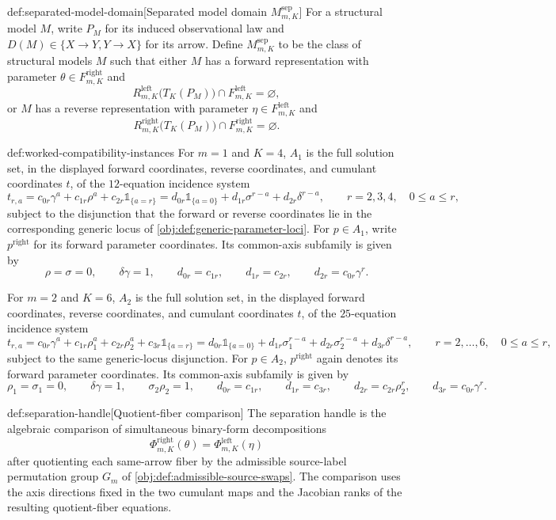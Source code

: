 \begin{definitionv}{def:separated-model-domain}[Separated model domain \(M^{\mathrm{sep}}_{m,K}\)]
For a structural model \(M\), write \(P_M\) for its induced observational law and \(D(M)\in\{X\to Y,Y\to X\}\) for its arrow. Define \(M^{\mathrm{sep}}_{m,K}\) to be the class of structural models \(M\) such that either \(M\) has a forward representation with parameter \(\theta\in F^{\mathrm{right}}_{m,K}\) and
\[
R^{\mathrm{left}}_{m,K}\bigl(T_K(P_M)\bigr)\cap F^{\mathrm{left}}_{m,K}=\varnothing,
\]
or \(M\) has a reverse representation with parameter \(\eta\in F^{\mathrm{left}}_{m,K}\) and
\[
R^{\mathrm{right}}_{m,K}\bigl(T_K(P_M)\bigr)\cap F^{\mathrm{right}}_{m,K}=\varnothing.
\]
\end{definitionv}

\begin{definitionv}{def:worked-compatibility-instances}
For \(m=1\) and \(K=4\), \(A_1\) is the full solution set, in the displayed forward coordinates, reverse coordinates, and cumulant coordinates \(t\), of the \(12\)-equation incidence system
\[
t_{r,a}
=
c_{0r}\gamma^a+c_{1r}\rho^a+c_{2r}\mathbb 1_{\{a=r\}}
=
d_{0r}\mathbb 1_{\{a=0\}}+d_{1r}\sigma^{r-a}+d_{2r}\delta^{r-a},
\qquad
r=2,3,4,\quad 0\leq a\leq r,
\]
subject to the disjunction that the forward or reverse coordinates lie in the corresponding generic locus of \cref{obj:def:generic-parameter-loci}. For \(p\in A_1\), write \(p^{\mathrm{right}}\) for its forward parameter coordinates. Its common-axis subfamily is given by
\[
\rho=\sigma=0,\qquad
\delta\gamma=1,\qquad
d_{0r}=c_{1r},\qquad
d_{1r}=c_{2r},\qquad
d_{2r}=c_{0r}\gamma^r.
\]

For \(m=2\) and \(K=6\), \(A_2\) is the full solution set, in the displayed forward coordinates, reverse coordinates, and cumulant coordinates \(t\), of the \(25\)-equation incidence system
\[
t_{r,a}
=
c_{0r}\gamma^a+c_{1r}\rho_1^a+c_{2r}\rho_2^a+c_{3r}\mathbb 1_{\{a=r\}}
=
d_{0r}\mathbb 1_{\{a=0\}}+d_{1r}\sigma_1^{r-a}+d_{2r}\sigma_2^{r-a}+d_{3r}\delta^{r-a},
\qquad
r=2,\ldots,6,\quad 0\leq a\leq r,
\]
subject to the same generic-locus disjunction. For \(p\in A_2\), \(p^{\mathrm{right}}\) again denotes its forward parameter coordinates. Its common-axis subfamily is given by
\[
\rho_1=\sigma_1=0,\qquad
\delta\gamma=1,\qquad
\sigma_2\rho_2=1,\qquad
d_{0r}=c_{1r},\qquad
d_{1r}=c_{3r},\qquad
d_{2r}=c_{2r}\rho_2^r,\qquad
d_{3r}=c_{0r}\gamma^r.
\]
\end{definitionv}

\begin{definitionv}{def:separation-handle}[Quotient-fiber comparison]
The separation handle is the algebraic comparison of simultaneous binary-form decompositions
\[
\Phi^{\mathrm{right}}_{m,K}(\theta)=\Phi^{\mathrm{left}}_{m,K}(\eta)
\]
after quotienting each same-arrow fiber by the admissible source-label permutation group \(G_m\) of \cref{obj:def:admissible-source-swaps}.  The comparison uses the axis directions fixed in the two cumulant maps and the Jacobian ranks of the resulting quotient-fiber equations.
\end{definitionv}

